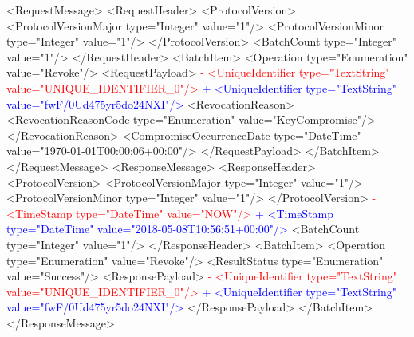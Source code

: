  \newpage
 <RequestMessage>
   <RequestHeader>
     <ProtocolVersion>
       <ProtocolVersionMajor type="Integer" value="1"/>
       <ProtocolVersionMinor type="Integer" value="1"/>
     </ProtocolVersion>
     <BatchCount type="Integer" value="1"/>
   </RequestHeader>
   <BatchItem>
     <Operation type="Enumeration" value="Revoke"/>
     <RequestPayload>
\textcolor{red}{-      <UniqueIdentifier type="TextString" value="UNIQUE_IDENTIFIER_0"/>}
\textcolor{blue}{+      <UniqueIdentifier type="TextString" value="fwF/0Ud475yr5do24NXI"/>}
       <RevocationReason>
         <RevocationReasonCode type="Enumeration" value="KeyCompromise"/>
       </RevocationReason>
       <CompromiseOccurrenceDate type="DateTime" value="1970-01-01T00:00:06+00:00"/>
     </RequestPayload>
   </BatchItem>
 </RequestMessage>
 <ResponseMessage>
   <ResponseHeader>
     <ProtocolVersion>
       <ProtocolVersionMajor type="Integer" value="1"/>
       <ProtocolVersionMinor type="Integer" value="1"/>
     </ProtocolVersion>
\textcolor{red}{-    <TimeStamp type="DateTime" value="NOW"/>}
\textcolor{blue}{+    <TimeStamp type="DateTime" value="2018-05-08T10:56:51+00:00"/>}
     <BatchCount type="Integer" value="1"/>
   </ResponseHeader>
   <BatchItem>
     <Operation type="Enumeration" value="Revoke"/>
     <ResultStatus type="Enumeration" value="Success"/>
     <ResponsePayload>
\textcolor{red}{-      <UniqueIdentifier type="TextString" value="UNIQUE_IDENTIFIER_0"/>}
\textcolor{blue}{+      <UniqueIdentifier type="TextString" value="fwF/0Ud475yr5do24NXI"/>}
     </ResponsePayload>
   </BatchItem>
 </ResponseMessage>
 
